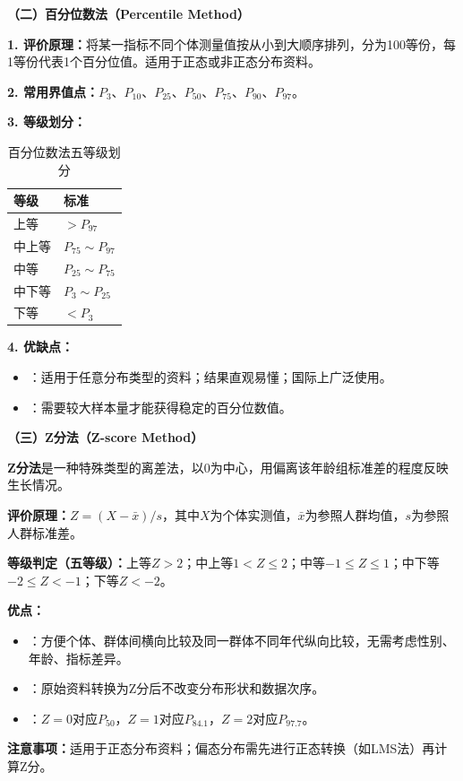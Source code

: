 \begin{keybox}
\textbf{（二）百分位数法（Percentile Method）}

\textbf{1. 评价原理：}将某一指标不同个体测量值按从小到大顺序排列，分为100等份，每1等份代表1个百分位值。适用于正态或非正态分布资料。

\textbf{2. 常用界值点：}$P_3$、$P_{10}$、$P_{25}$、$P_{50}$、$P_{75}$、$P_{90}$、$P_{97}$。

\textbf{3. 等级划分：}

\begin{table}[H]
\centering
\caption{百分位数法五等级划分}
\begin{tabularx}{\textwidth}{ll}
\hline
\textbf{等级} & \textbf{标准} \\
\hline
上等   & $> P_{97}$ \\
中上等 & $P_{75} \sim P_{97}$ \\
中等   & $P_{25} \sim P_{75}$ \\
中下等 & $P_3 \sim P_{25}$ \\
下等   & $< P_3$ \\
\hline
\end{tabularx}
\end{table}

\textbf{4. 优缺点：}

\begin{itemize}[leftmargin=*]
    \item {}：适用于任意分布类型的资料；结果直观易懂；国际上广泛使用。
    \item {}：需要较大样本量才能获得稳定的百分位数值。
\end{itemize}
\end{keybox}

\textbf{（三）Z分法（Z-score Method）}

\begin{defbox}
\textbf{Z分法}是一种特殊类型的离差法，以0为中心，用偏离该年龄组标准差的程度反映生长情况。

\textbf{评价原理：}$Z = (X - \bar{x}) / s$，其中$X$为个体实测值，$\bar{x}$为参照人群均值，$s$为参照人群标准差。

\textbf{等级判定（五等级）：}上等$Z>2$；中上等$1<Z\leq2$；中等$-1\leq Z\leq1$；中下等$-2\leq Z<-1$；下等$Z<-2$。

\textbf{优点：}
\begin{itemize}[leftmargin=*]
    \item {}：方便个体、群体间横向比较及同一群体不同年代纵向比较，无需考虑性别、年龄、指标差异。
    \item {}：原始资料转换为Z分后不改变分布形状和数据次序。
    \item {}：$Z=0$对应$P_{50}$，$Z=1$对应$P_{84.1}$，$Z=2$对应$P_{97.7}$。
\end{itemize}

\textbf{注意事项：}适用于正态分布资料；偏态分布需先进行正态转换（如LMS法）再计算Z分。
\end{defbox}

